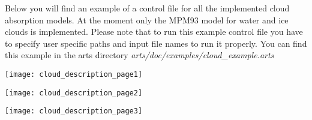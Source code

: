 \label{leveld:ArtsCloudModelExampleControlFile}
Below you will find an example of a control file for all 
the implemented cloud absorption models. At the moment only 
the MPM93 model for water and ice clouds is implemented.
Please note that to run this example control file you 
have to specify user specific paths and input file names 
to run it properly. You can find this example in the 
arts directory {\it arts/doc/examples/cloud\_example.arts}
%
\begin{flushleft}
 \texttt{[image: cloud\_description\_page1]}
\end{flushleft}
\begin{flushleft}
 \texttt{[image: cloud\_description\_page2]}
\end{flushleft}
\begin{flushleft}
 \texttt{[image: cloud\_description\_page3]}
\end{flushleft}





